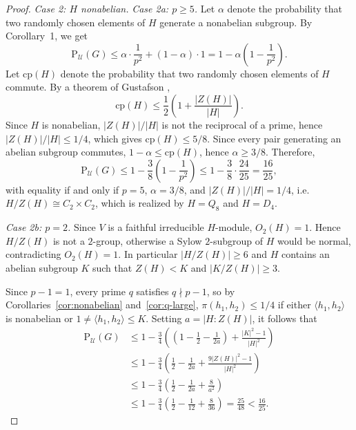 \documentclass[10pt,a4paper]{amsart}
\newcommand{\Psu}{\mathrm{P}_{\mathcal{U}}}
\newcommand{\cp}{\mathrm{cp}}
\begin{document}
\begin{proof}
	\medskip
	\noindent\textit{Case 2: $H$ nonabelian.}	
		\medskip
		\noindent\textit{Case 2a: $p \geq 5$.}
			Let $\alpha$ denote the probability that two randomly chosen 
		elements of $H$ generate a nonabelian subgroup. By 
		Corollary~1, we get
		$$\mathrm{P}_{\mathcal{U}}(G) \leq \alpha \cdot \frac{1}{p^2} 
		+ (1-\alpha) \cdot 1 = 1 - \alpha\left(1-\frac{1}{p^2}\right).$$
	Let $\cp(H)$ denote the probability that two randomly chosen 
	elements of $H$ commute. By a theorem of Gustafson \cite{Gus73},
	$$\cp(H) \leq \frac{1}{2}\left(1 + \frac{|Z(H)|}{|H|}\right).$$
	Since $H$ is nonabelian, $|Z(H)|/|H|$ is not the reciprocal 
	of a prime, hence $|Z(H)|/|H| \leq 1/4$, which gives 
	$\cp(H) \leq 5/8$. Since every pair generating an abelian 
	subgroup commutes, $1 - \alpha \leq \cp(H)$, hence 
	$\alpha \geq 3/8$. Therefore,
	$$\Psu(G) \leq 1 - \frac{3}{8}\left(1-\frac{1}{p^2}\right) 
	\leq 1 - \frac{3}{8}\cdot\frac{24}{25} = \frac{16}{25},$$
	with equality if and only if $p=5$, $\alpha = 3/8$, and 
	$|Z(H)|/|H| = 1/4$, i.e.\ $H/Z(H) \cong C_2 \times C_2$, 
	which is realized by $H = Q_8$ and $H = D_4$.
		
		\medskip
		
		
		
		
		
		\noindent\textit{Case 2b: $p = 2$.}
	Since $V$ is a faithful irreducible $H$-module, $O_2(H)=1.$
	Hence $H/Z(H)$ is not a $2$-group, otherwise a Sylow 
	$2$-subgroup of $H$ would be normal, contradicting $O_2(H)=1$. 
	In particular $|H/Z(H)| \geq 6$ and $H$ contains an abelian subgroup 
	$K$ such that $Z(H) < K$ and $|K/Z(H)| \geq 3$.
	
	Since $p-1=1$, every prime $q$ satisfies $q \nmid p-1$, so 
	by Corollaries~\ref{cor:nonabelian} and~\ref{cor:q-large}, 
	$\pi(h_1,h_2) \leq 1/4$ if either $\langle h_1,h_2\rangle$ 
	is nonabelian or $1 \neq \langle h_1,h_2\rangle \leq K$.
	Setting $a = |H:Z(H)|$, it follows that
	\begin{align*}
		\Psu(G) &\leq 1-\frac{3}{4}\left(\left(1-\frac{1}{2}
		-\frac{1}{2a}\right)+\frac{|K|^2-1}{|H|^2}\right)\\
		&\leq 1-\frac{3}{4}\left(\frac{1}{2}-\frac{1}{2a}+
		\frac{9|Z(H)|^2-1}{|H|^2}\right)\\
		&\leq 1-\frac{3}{4}\left(\frac{1}{2}-\frac{1}{2a}+
		\frac{8}{a^2}\right)\\
		&\leq 1-\frac{3}{4}\left(\frac{1}{2}-\frac{1}{12}+
		\frac{8}{36}\right) = \frac{25}{48} < \frac{16}{25}.
	\end{align*}
	

\end{proof}
\end{document}
